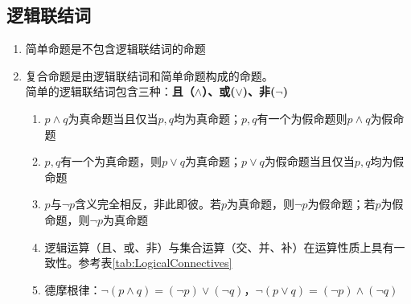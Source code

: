 \subsection*{逻辑联结词}
\begin{enumerate}
    \item 简单命题是不包含逻辑联结词的命题
    \item 复合命题是由逻辑联结词和简单命题构成的命题。\\
            简单的逻辑联结词包含三种：\textbf{且（$\land$）、或($\vee$)、非($\neg$)}
            \begin{enumerate}
                \item $p \land q$为真命题当且仅当$p,q$均为真命题；$p,q$有一个为假命题则$p \land q$为假命题
                \item $p,q$有一个为真命题，则$p \vee q$为真命题；$p \vee q$为假命题当且仅当$p,q$均为假命题
                \item $p$与$\neg p$含义完全相反，非此即彼。若$p$为真命题，则$\neg p$为假命题；若$p$为假命题，则$\neg p$为真命题
                \item 逻辑运算（且、或、非）与集合运算（交、并、补）在运算性质上具有一致性。参考表\ref{tab:LogicalConnectives}
                \item 德摩根律：$\neg (p \land q) = (\neg p) \vee (\neg q)$，$\neg (p \vee q) = (\neg p) \land (\neg q)$
            \end{enumerate}
\end{enumerate}

